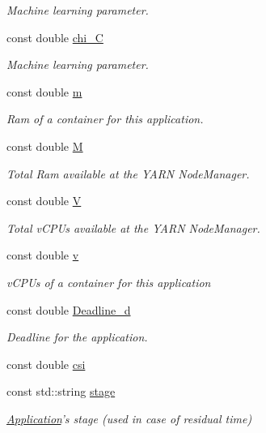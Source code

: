 \begin{DoxyCompactItemize}
\begin{DoxyCompactList}\small\item\em Machine learning parameter. \end{DoxyCompactList}\item 
const double \hyperlink{classApplication_a73d8a1604a2b2c99b14db1c8bd9c2798}{chi\-\_\-\-C}
\begin{DoxyCompactList}\small\item\em Machine learning parameter. \end{DoxyCompactList}\item 
const double \hyperlink{classApplication_ad95ca8809237917d16779d7ed0013c8e}{m}
\begin{DoxyCompactList}\small\item\em Ram of a container for this application. \end{DoxyCompactList}\item 
const double \hyperlink{classApplication_a98cc47f6aa4ac3c70133d2922952ef7a}{M}
\begin{DoxyCompactList}\small\item\em Total Ram available at the Y\-A\-R\-N Node\-Manager. \end{DoxyCompactList}\item 
const double \hyperlink{classApplication_a03a99fa3553c376653e53bb5f489c316}{V}
\begin{DoxyCompactList}\small\item\em Total v\-C\-P\-Us available at the Y\-A\-R\-N Node\-Manager. \end{DoxyCompactList}\item 
const double \hyperlink{classApplication_a57853498c230af817bc4173169847bfc}{v}
\begin{DoxyCompactList}\small\item\em v\-C\-P\-Us of a container for this application \end{DoxyCompactList}\item 
const double \hyperlink{classApplication_ae90c165056428718e7341999781a3963}{Deadline\-\_\-d}
\begin{DoxyCompactList}\small\item\em Deadline for the application. \end{DoxyCompactList}\item 
const double \hyperlink{classApplication_a7c4d5b6d8d7b2c480008dbd958872ed2}{csi}
\item 
const std\-::string \hyperlink{classApplication_a27731ed4d16f6e9583b52c4f09a69258}{stage}
\begin{DoxyCompactList}\small\item\em \hyperlink{classApplication}{Application}'s stage (used in case of residual time) \end{DoxyCompactList}\item 

\end{DoxyCompactItemize}
